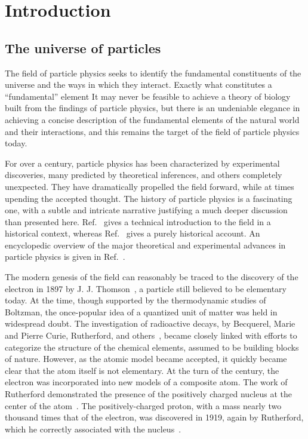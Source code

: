\chapter{Introduction}
\label{ch:introduction}

\section{The universe of particles}

The field of particle physics seeks to identify the fundamental
constituents of the universe and the ways in which they interact.
Exactly what constitutes a ``fundamental'' element
It may never be feasible
to achieve a theory of biology built from the findings of particle 
physics, but there is an undeniable elegance in achieving a concise description
of the fundamental elements of the natural world and their interactions,
and this remains the target of the field of particle physics today. 

For over a century, particle physics has been characterized by experimental
discoveries, many predicted by theoretical inferences, and others 
completely unexpected.
They have dramatically propelled the field forward,
while at times upending the accepted thought.
The history of particle physics is a fascinating one, with a subtle 
and intricate narrative justifying a much deeper discussion than presented
here. Ref.~\cite{Griffiths:2008zz} gives a technical introduction to the field in a historical
context, whereas Ref.~\cite{kragh2002quantum} gives a purely 
historical account. An encyclopedic overview of the major
theoretical and experimental advances in particle physics is given in Ref.~\cite{Ezhela:1996xi}.

The modern genesis of the field can reasonably be traced to 
the discovery of the electron in 1897 by J. J. Thomson~\cite{doi:10.1080/14786449708621070}, a particle still
believed to be elementary today.
At the time, though supported by the thermodynamic studies of Boltzman,
the once-popular idea of a quantized unit of matter was
held in widespread doubt. 
The investigation of radioactive decays, by Becquerel,
Marie and Pierre Curie, Rutherford, and others~\cite{RADVANYI2017544}, 
became closely linked with efforts to categorize
the structure of the chemical elements, assumed to be
building blocks of nature. 
However, as the atomic model became accepted, 
it quickly became clear that the atom itself is not elementary.
At the turn of the century, the electron was incorporated into 
new models of a composite atom.
The work of Rutherford demonstrated the presence of the
positively charged nucleus at the center of the atom~\cite{Rutherford:1911zz}.
The positively-charged proton, with a mass nearly two thousand times
that of the electron, was discovered in 1919, again by Rutherford,
which he correctly associated with the 
nucleus~\cite{doi:10.1080/14786440608635919}.

